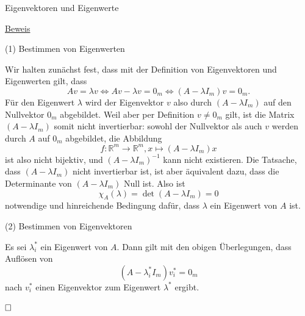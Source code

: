 \documentclass[
  8pt,
  ignorenonframetext,
]{beamer}
\begin{document}
\begin{frame}{Eigenvektoren und Eigenwerte}
\protect\hypertarget{eigenvektoren-und-eigenwerte-4}{}
\footnotesize

\underline{Beweis}

\noindent (1) Bestimmen von Eigenwerten

Wir halten zunächst fest, dass mit der Definition von Eigenvektoren und
Eigenwerten gilt, dass \begin{equation}
Av = \lambda v
\Leftrightarrow Av - \lambda v = 0_m
\Leftrightarrow (A - \lambda I_m)v = 0_m.
\end{equation} Für den Eigenwert \(\lambda\) wird der Eigenvektor \(v\)
also durch \((A - \lambda I_m)\) auf den Nullvektor \(0_m\) abgebildet.
Weil aber per Definition \(v \neq 0_m\) gilt, ist die Matrix
\((A - \lambda I_m)\) somit nicht invertierbar: sowohl der Nullvektor
als auch \(v\) werden durch \(A\) auf \(0_m\) abgebildet, die Abbildung
\begin{equation}
f : \mathbb{R}^m \to \mathbb{R}^m, x \mapsto (A - \lambda I_m)x
\end{equation} ist also nicht bijektiv, und \((A - \lambda I_m)^{-1}\)
kann nicht existieren. Die Tatsache, dass \((A - \lambda I_m)\) nicht
invertierbar ist, ist aber äquivalent dazu, dass die Determinante von
\((A -\lambda I_m)\) Null ist. Also ist \begin{equation}
\chi_A(\lambda) = \det(A - \lambda I_m) = 0
\end{equation} notwendige und hinreichende Bedingung dafür, dass
\(\lambda\) ein Eigenwert von \(A\) ist.

\noindent (2) Bestimmen von Eigenvektoren

Es sei \(\lambda_i^*\) ein Eigenwert von \(A\). Dann gilt mit den obigen
Überlegungen, dass Auflösen von \begin{equation}
(A - \lambda_i^* I_m)v_i^* = 0_m
\end{equation} nach \(v_i^*\) einen Eigenvektor zum Eigenwert
\(\lambda^*\) ergibt.

\(\hfill \Box\)
\end{frame}
\end{document}

